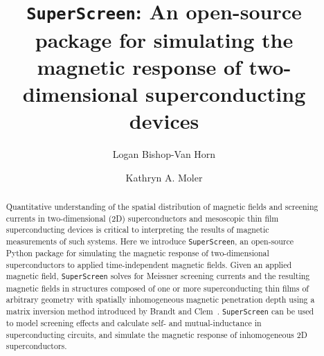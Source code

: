 \documentclass[final,3p,times]{elsarticle}
\newcommand{\inline}[1]{\texttt{#1}\xspace}
\newcommand{\SuperScreen}{\inline{SuperScreen}}
\begin{document}
\begin{frontmatter}



\title{\texttt{SuperScreen}: An open-source package for simulating the magnetic response of two-dimensional superconducting devices}


\author[PHYS,SIMES]{Logan Bishop-Van Horn}
\author[AP,SIMES,GLAM]{Kathryn A. Moler}


\address[PHYS]{Department of Physics, Stanford University, Stanford, California 94305, USA}
\address[AP]{Department of Applied Physics, Stanford University, Stanford, California 94305, USA}
\address[SIMES]{Stanford Institute for Materials and Energy Sciences, SLAC National Accelerator Laboratory, 2575 Sand Hill Road, Menlo Park, California 94025, USA}
\address[GLAM]{Geballe Laboratory for Advanced Materials, Stanford University, Stanford, California 94305, USA}

\begin{abstract}
Quantitative understanding of the spatial distribution of magnetic fields and screening currents in two-dimensional (2D) superconductors and mesoscopic thin film superconducting devices is critical to interpreting the results of magnetic measurements of such systems.
Here we introduce \SuperScreen, an open-source Python package for simulating the magnetic response of two-dimensional superconductors to applied time-independent magnetic fields. Given an applied magnetic field, \SuperScreen solves for Meissner screening currents and the resulting magnetic fields in structures composed of one or more superconducting thin films of arbitrary geometry with spatially inhomogeneous magnetic penetration depth using a matrix inversion method introduced by Brandt and Clem~\cite{Brandt_Clem_2004, brandt_thin_2005}. \SuperScreen can be used to model screening effects and calculate self- and mutual-inductance in superconducting circuits, and simulate the magnetic response of inhomogeneous 2D superconductors.


\end{abstract}
\end{frontmatter}
\end{document}
